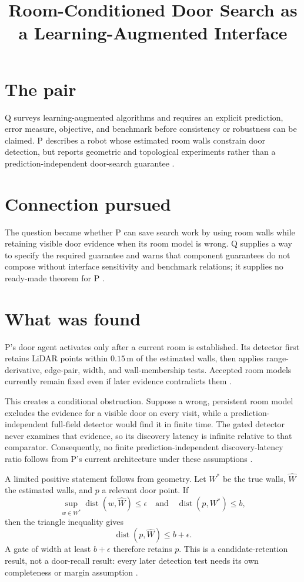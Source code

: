 \documentclass{article}
\title{Room-Conditioned Door Search as a Learning-Augmented Interface}
\begin{document}
\maketitle

\section*{The pair}

Q surveys learning-augmented algorithms and requires an explicit prediction, error measure, objective, and benchmark before consistency or robustness can be claimed. P describes a robot whose estimated room walls constrain door detection, but reports geometric and topological experiments rather than a prediction-independent door-search guarantee .

\section*{Connection pursued}

The question became whether P can save search work by using room walls while retaining visible door evidence when its room model is wrong. Q supplies a way to specify the required guarantee and warns that component guarantees do not compose without interface sensitivity and benchmark relations; it supplies no ready-made theorem for P .

\section*{What was found}

P's door agent activates only after a current room is established. Its detector first retains LiDAR points within \(0.15\,\mathrm{m}\) of the estimated walls, then applies range-derivative, edge-pair, width, and wall-membership tests. Accepted room models currently remain fixed even if later evidence contradicts them .

This creates a conditional obstruction. Suppose a wrong, persistent room model excludes the evidence for a visible door on every visit, while a prediction-independent full-field detector would find it in finite time. The gated detector never examines that evidence, so its discovery latency is infinite relative to that comparator. Consequently, no finite prediction-independent discovery-latency ratio follows from P's current architecture under these assumptions .

A limited positive statement follows from geometry. Let \(W^*\) be the true walls, \(\widehat W\) the estimated walls, and \(p\) a relevant door point. If
\[
\sup_{w\in W^*}\operatorname{dist}(w,\widehat W)\leq\epsilon
\quad\text{and}\quad
\operatorname{dist}(p,W^*)\leq b,
\]
then the triangle inequality gives
\[
\operatorname{dist}(p,\widehat W)\leq b+\epsilon.
\]
A gate of width at least \(b+\epsilon\) therefore retains \(p\). This is a candidate-retention result, not a door-recall result: every later detection test needs its own completeness or margin assumption .
\end{document}
